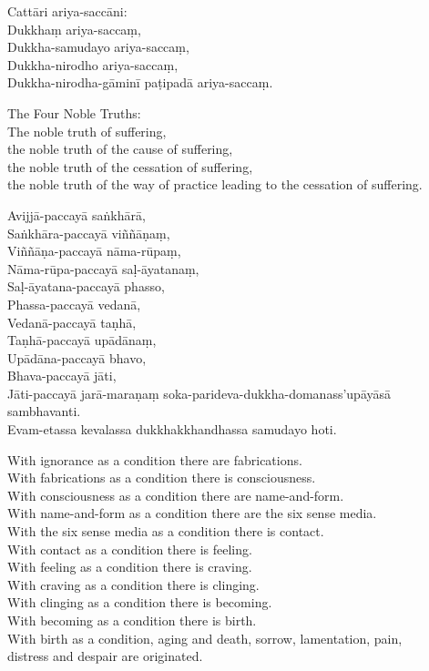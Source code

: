 Cattāri ariya-saccāni:\\
Dukkhaṃ ariya-saccaṃ,\\
Dukkha-samudayo ariya-saccaṃ,\\
Dukkha-nirodho ariya-saccaṃ,\\
Dukkha-nirodha-gāminī paṭipadā ariya-saccaṃ.

\begin{english}
  The Four Noble Truths:\\
  The noble truth of suffering,\\
  the noble truth of the cause of suffering,\\
  the noble truth of the cessation of suffering,\\
  the noble truth of the way of practice leading to the cessation of suffering.
\end{english}

Avijjā-paccayā saṅkhārā,\\
Saṅkhāra-paccayā viññāṇaṃ,\\
Viññāṇa-paccayā nāma-rūpaṃ,\\
Nāma-rūpa-paccayā saḷ-āyatanaṃ,\\
Saḷ-āyatana-paccayā phasso,\\
Phassa-paccayā vedanā,\\
Vedanā-paccayā taṇhā,\\
Taṇhā-paccayā upādānaṃ,\\
Upādāna-paccayā bhavo,\\
Bhava-paccayā jāti,\\
Jāti-paccayā jarā-maraṇaṃ soka-parideva-dukkha-domanass'upāyāsā sambhavanti.\\
Evam-etassa kevalassa dukkhakkhandhassa samudayo hoti.

\begin{english}
  With ignorance as a condition there are fabrications.\\
  With fabrications as a condition there is consciousness.\\
  With consciousness as a condition there are name-and-form.\\
  With name-and-form as a condition there are the six sense media.\\
  With the six sense media as a condition there is contact.\\
  With contact as a condition there is feeling.\\
  With feeling as a condition there is craving.\\
  With craving as a condition there is clinging.\\
  With clinging as a condition there is becoming.\\
  With becoming as a condition there is birth.\\
  With birth as a condition, aging and death, sorrow, lamentation, pain,\\
  distress and despair are originated.
\end{english}

